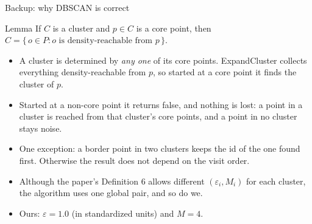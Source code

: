 \documentclass[aspectratio=169]{beamer}
\newcommand{\src}[1]{\par\vspace{2pt}\hfill{\scriptsize\textcolor{gray}{\parencite{#1}}}}
\begin{document}
\begin{frame}{Backup: why DBSCAN is correct}
\begin{block}{Lemma}
If $C$ is a cluster and $p \in C$ is a core point, then $C = \{\, o \in P : o \text{ is density-reachable from } p \,\}$.
\src{ester1996dbscan}
\end{block}
\begin{itemize}
  \item A cluster is determined by \emph{any one} of its core points. ExpandCluster collects everything density-reachable from $p$, so started at a core point it finds the cluster of $p$.
  \item Started at a non-core point it returns false, and nothing is lost: a point in a cluster is reached from that cluster's core points, and a point in no cluster stays noise.
  \item One exception: a border point in two clusters keeps the id of the one found first. Otherwise the result does not depend on the visit order. \hfill\parencite[pp.~229--230]{ester1996dbscan}
  \item Although the paper's Definition 6 allows different $(\varepsilon_i, M_i)$ for each cluster, the algorithm uses \alert{one global pair}, and so do we. \hfill\parencite{ester1996dbscan}
  \item Ours: $\varepsilon = 1.0$ (in standardized units) and $M = 4$.
\end{itemize}
\end{frame}
\end{document}
